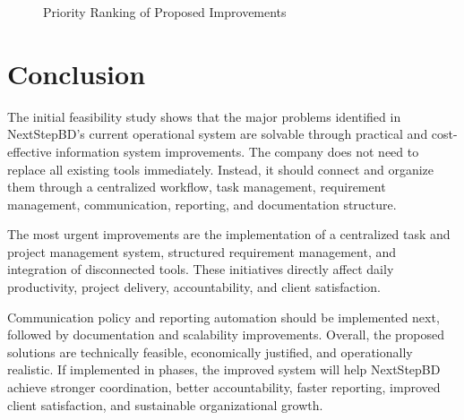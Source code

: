 \documentclass[12pt,a4paper]{report}
\begin{document}
\begin{figure}[H]
\centering
{}
\caption{Priority Ranking of Proposed Improvements}
\end{figure}

\section{Conclusion}

The initial feasibility study shows that the major problems identified in NextStepBD's current operational system are solvable through practical and cost-effective information system improvements. The company does not need to replace all existing tools immediately. Instead, it should connect and organize them through a centralized workflow, task management, requirement management, communication, reporting, and documentation structure.

The most urgent improvements are the implementation of a centralized task and project management system, structured requirement management, and integration of disconnected tools. These initiatives directly affect daily productivity, project delivery, accountability, and client satisfaction.

Communication policy and reporting automation should be implemented next, followed by documentation and scalability improvements. Overall, the proposed solutions are technically feasible, economically justified, and operationally realistic. If implemented in phases, the improved system will help NextStepBD achieve stronger coordination, better accountability, faster reporting, improved client satisfaction, and sustainable organizational growth.
\end{document}
